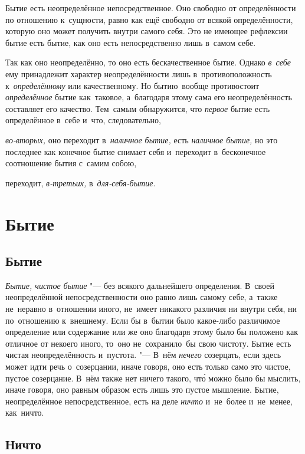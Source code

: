 Бытие есть неопределённое непосредственное. Оно свободно от определённости по
отношению к~сущности, равно как ещё свободно от всякой определённости, которую
оно может получить внутри самого себя. Это не имеющее рефлексии бытие есть
бытие, как оно есть непосредственно лишь в~самом себе.

Так как оно неопределённо, то оно есть бескачественное бытие. Однако
{\em в~себе} ему принадлежит характер неопределённости лишь в~противоположность
к~{\em определённому} или качественному. Но бытию~вообще противостоит
{\em определённое} бытие как~таковое, а~благодаря этому сама его
неопределённость составляет его качество. Тем~самым обнаружится, что
{\em первое} бытие есть определённое в~себе и~что, следовательно,

{\em во-вторых,} оно переходит в~{\em наличное бытие,} есть
{\em наличное бытие,} но это последнее как конечное бытие снимает себя
и~переходит в~бесконечное соотношение бытия с~самим собою,

переходит, {\em в-третьих,} в~{\em для-себя-бытие}.

\section{Бытие}

\subsection{Бытие}


{\em Бытие, чистое бытие} "--- без всякого дальнейшего определения.
В~своей неопределённой непосредственности оно равно лишь самому себе, а~также
не~неравно в~отношении иного, не~имеет никакого различия ни внутри себя, ни
по~отношению к~внешнему. Если бы в~бытии было какое-либо различимое определение
или содержание или же оно благодаря этому было бы положено как отличное от
некоего иного, то~оно не~сохранило~бы свою чистоту. Бытие есть чистая
неопределённость и~пустота. "--- В~нём {\em нечего} созерцать, если здесь может
идти речь о~созерцании, иначе говоря, оно есть только само это чистое, пустое
созерцание. В~нём также нет ничего такого, чт\'{о} можно было бы мыслить, иначе
говоря, оно равным образом есть лишь это пустое мышление. Бытие, неопределённое
непосредственное, есть на деле {\em ничто} и~не~более и~не~менее, как~ничто.

\subsection{Ничто}

